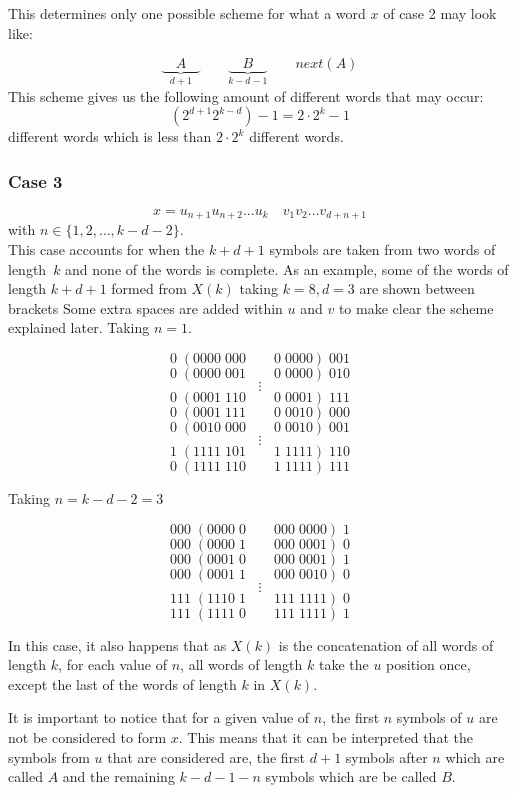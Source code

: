 \documentclass[11pt,a4paper]{tesis}
\begin{document}
This determines only one possible scheme for what a word $x$ of case 2 may look like:

$$\underbrace{\quad A \quad }_{d +1} \qquad \underbrace{\quad B \quad }_{k - d - 1}  \qquad next(A)$$
This scheme gives us the following amount of different words that may occur:
$$(2^{d + 1} 2^{k-d})-1=  2 \cdot 2^k - 1$$
different words which is less than $2 \cdot 2^k$ different words.

\subsubsection{Case 3}
$$x = u_{n+1} u_{n+2} \dots u_k \quad  v_1 v_2 \dots v_{d+n+1} $$
with $n \in \{1,2,\dots ,k - d - 2\}$.
\\

This case accounts for when the $k + d + 1$ symbols are taken from two words of length~$k$ and none of the words is complete.
As an example, some of the words of length $k + d + 1$ formed from $X(k)$ taking $k = 8, d = 3$ are shown between brackets
Some extra spaces are added within $u$ and $v$ to make clear the scheme explained later.
Taking $n = 1$.


$$0\; (0000\; 000 \qquad 0 \;0000 ) \;001$$
$$0\; (0000 \;001 \qquad 0 \;0000 ) \;010$$
$$\vdots$$
$$0\; (0001 \;110 \qquad 0 \;0001 ) \;111$$
$$0\; (0001 \;111 \qquad 0 \;0010 ) \;000$$
$$0\; (0010 \;000 \qquad 0 \;0010 ) \;001$$
$$\vdots$$
$$1\; (1111 \;101 \qquad 1 \;1111 ) \;110$$
$$0\; (1111 \;110 \qquad 1 \;1111 ) \;111$$

Taking $n = k - d - 2 = 3$

$$000\; (0000\; 0 \qquad 000 \;0000 ) \;1$$
$$000\; (0000\; 1 \qquad 000 \;0001 ) \;0$$
$$000\; (0001\; 0 \qquad 000 \;0001 ) \;1$$
$$000\; (0001\; 1 \qquad 000 \;0010 ) \;0$$
$$\vdots$$
$$111\; (1110\; 1 \qquad 111 \;1111 ) \;0$$
$$111\; (1111\; 0 \qquad 111 \;1111 ) \;1$$

In this case, it also happens that as $X(k)$ is the concatenation of all words of length $k$, for each value of $n$, all words of length $k$ take the $u$ position once, except the last of the words of length $k$ in $X(k)$.

It is important to notice that for a given value of $n$, the first $n$ symbols of $u$ are not be considered to form $x$. This means that it can be interpreted that the symbols from  $u$ that are considered are, the first $d + 1$ symbols after $n$ which are called $A$ and the remaining $k - d - 1 - n$ symbols which are be called $B$.
\end{document}
